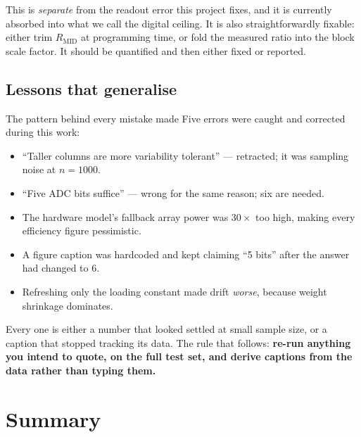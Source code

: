\documentclass[11pt,a4paper]{report}
\begin{document}
This is \emph{separate} from the readout error this project fixes, and it is
currently absorbed into what we call the digital ceiling. It is also
straightforwardly fixable: either trim $R_{\mathrm{MID}}$ at programming time,
or fold the measured ratio into the block scale factor. It should be
quantified and then either fixed or reported.

\section{Lessons that generalise}

\begin{warnbox}{The pattern behind every mistake made}
Five errors were caught and corrected during this work:
\begin{itemize}[leftmargin=1.3em]
  \item ``Taller columns are more variability tolerant'' --- retracted; it was
        sampling noise at $n=1000$.
  \item ``Five ADC bits suffice'' --- wrong for the same reason; six are
        needed.
  \item The hardware model's fallback array power was $30\times$ too high,
        making every efficiency figure pessimistic.
  \item A figure caption was hardcoded and kept claiming ``5 bits'' after the
        answer had changed to 6.
  \item Refreshing only the loading constant made drift \emph{worse}, because
        weight shrinkage dominates.
\end{itemize}

Every one is either a number that looked settled at small sample size, or a
caption that stopped tracking its data. The rule that follows: \textbf{re-run
anything you intend to quote, on the full test set, and derive captions from
the data rather than typing them.}
\end{warnbox}

\chapter{Summary}
\end{document}
